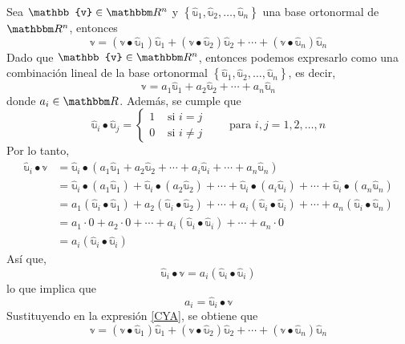 \begin{theorem}\label{BAHJQGGGFFDQFXXFHZHAHQGYQ}
    Sea $\mathbb{v} \in \RR[n]$ y $\left\{ \hat{\mathbb{u}}_1, \hat{\mathbb{u}}_2, \dots, \hat{\mathbb{u}}_n \right\}$ una base ortonormal de $\RR[n]$, entonces
    $$\mathbb{v} = (\mathbb{v} \bullet \hat{\mathbb{u}}_1)\hat{\mathbb{u}}_1 + (\mathbb{v} \bullet \hat{\mathbb{u}}_2)\hat{\mathbb{u}}_2 + \cdots + (\mathbb{v} \bullet \hat{\mathbb{u}}_n)\hat{\mathbb{u}}_n$$
    \demostracion Dado que $\mathbb{v} \in \RR[n]$, entonces podemos expresarlo como una combinación lineal de la base ortonormal $\left\{ \hat{\mathbb{u}}_1, \hat{\mathbb{u}}_2, \dots, \hat{\mathbb{u}}_n \right\}$, es decir,
    \begin{equation}
        \mathbb{v} = a_1\hat{\mathbb{u}}_1 + a_2\hat{\mathbb{u}}_2 + \cdots + a_n\hat{\mathbb{u}}_n \label{CYA}
    \end{equation}
    donde $a_i \in \RR$. Además, se cumple que
    $$\hat{\mathbb{u}}_i \bullet \hat{\mathbb{u}}_j = \begin{cases}
        1 & \text{ si } i = j \\
        0 & \text{ si } i \neq j
    \end{cases} \qquad \text{para } i, j = 1, 2, \dots, n$$
    Por lo tanto,
    \begin{align*}
        \hat{\mathbb{u}}_i \bullet \mathbb{v} & = \hat{\mathbb{u}}_i \bullet \left( a_1\hat{\mathbb{u}}_1 + a_2\hat{\mathbb{u}}_2 + \cdots + a_i\hat{\mathbb{u}}_i + \cdots + a_n\hat{\mathbb{u}}_n \right) \\
        & = \hat{\mathbb{u}}_i \bullet (a_1 \hat{\mathbb{u}}_1) + \hat{\mathbb{u}}_i \bullet (a_2 \hat{\mathbb{u}}_2) + \cdots + \hat{\mathbb{u}}_i \bullet (a_i \hat{\mathbb{u}}_i) + \cdots + \hat{\mathbb{u}}_i \bullet (a_n \hat{\mathbb{u}}_n) \\
        & = a_1(\hat{\mathbb{u}}_i \bullet \hat{\mathbb{u}}_1) + a_2(\hat{\mathbb{u}}_i \bullet \hat{\mathbb{u}}_2) + \cdots + a_i(\hat{\mathbb{u}}_i \bullet \hat{\mathbb{u}}_i) + \cdots + a_n(\hat{\mathbb{u}}_i \bullet \hat{\mathbb{u}}_n) \\
        & = a_1 \cdot 0 + a_2 \cdot 0 + \cdots + a_i(\hat{\mathbb{u}}_i \bullet \hat{\mathbb{u}}_i) + \cdots + a_n \cdot 0 \\
        & = a_i(\hat{\mathbb{u}}_i \bullet \hat{\mathbb{u}}_i)
    \end{align*}
    Así que,
    $$\hat{\mathbb{u}}_i \bullet \mathbb{v} = a_i(\hat{\mathbb{u}}_i \bullet \hat{\mathbb{u}}_i)$$
    lo que implica que
    $$a_i = \hat{\mathbb{u}}_i \bullet \mathbb{v}$$
    Sustituyendo en la expresión \eqref{CYA}, se obtiene que
    $$\mathbb{v} = (\mathbb{v} \bullet \hat{\mathbb{u}}_1)\hat{\mathbb{u}}_1 + (\mathbb{v} \bullet \hat{\mathbb{u}}_2)\hat{\mathbb{u}}_2 + \cdots + (\mathbb{v} \bullet \hat{\mathbb{u}}_n)\hat{\mathbb{u}}_n$$
\end{theorem}


